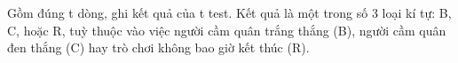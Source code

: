 Gồm đúng t dòng, ghi kết quả của t test. Kết quả là một trong số 3 loại kí tự: B, C, hoặc R, tuỳ thuộc vào việc người cầm quân trắng thắng (B), người cầm quân đen thắng (C) hay trò chơi không bao giờ kết thúc (R).  

\